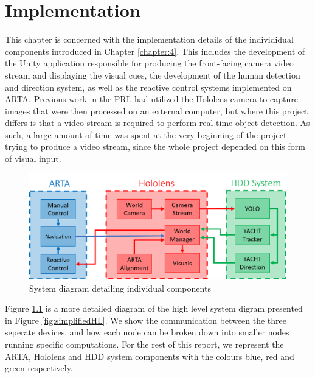 \chapter{Implementation}
This chapter is concerned with the implementation details of the individidual components introduced in Chapter \ref{chapter:4}. This includes the development of the Unity application responsible for producing the front-facing camera video stream and displaying the visual cues, the development of the human detection and direction system, as well as the reactive control systems implemented on ARTA. Previous work in the PRL had utilized the Hololens camera to capture images that were then processed on an external computer, but where this project differs is that a video stream is required to perform real-time object detection. As such, a large amount of time was spent at the very beginning of the project trying to produce a video stream, since the whole project depended on this form of visual input.

\begin{figure}[ht]
	\centering
	\includegraphics[width=1.0\linewidth]{img/chapter5_implementation/detailedSystemDiagram.png}
	\caption{System diagram detailing individual components}
	\label{fig:detailedHL}
\end{figure}

Figure \ref{fig:detailedHL} is a more detailed diagram of the high level system digram presented in Figure \ref{fig:simplifiedHL}. We show the communication between the three seperate devices, and how each node can be broken down into smaller nodes running specific computations. For the rest of this report, we represent the ARTA, Hololens and HDD system components with the colours blue, red and green respectively.


